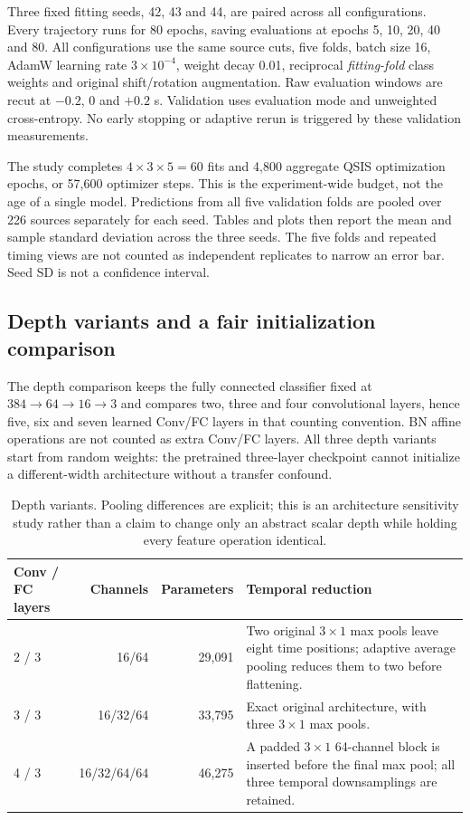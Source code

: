 \documentclass[a4paper,11pt,oneside]{article}
\begin{document}
Three fixed fitting seeds, 42, 43 and 44, are paired across all configurations.
Every trajectory runs for 80 epochs, saving evaluations at epochs 5, 10, 20,
40 and 80. All configurations use the same source cuts, five folds, batch
size 16, AdamW learning rate $3\times10^{-4}$, weight decay 0.01, reciprocal
\emph{fitting-fold} class weights and original shift/rotation augmentation.
Raw evaluation windows are recut at $-0.2$, 0 and $+0.2$ s. Validation uses
evaluation mode and unweighted cross-entropy. No early stopping or adaptive
rerun is triggered by these validation measurements.

The study completes $4\times3\times5=60$ fits and 4,800 aggregate QSIS
optimization epochs, or 57,600 optimizer steps. This is the experiment-wide
budget, not the age of a single model. Predictions from all five validation
folds are pooled over 226 sources separately for each seed. Tables and plots
then report the mean and sample standard deviation across the three seeds.
The five folds and repeated timing views are not counted as independent
replicates to narrow an error bar. Seed SD is not a confidence interval.

\subsection{Depth variants and a fair initialization comparison}
The depth comparison keeps the fully connected classifier fixed at
$384\rightarrow64\rightarrow16\rightarrow3$ and compares two, three and four
convolutional layers, hence five, six and seven learned Conv/FC layers in
that counting convention. BN affine operations are not counted as extra
Conv/FC layers. All three depth variants start from random weights: the
pretrained three-layer checkpoint cannot initialize a different-width
architecture without a transfer confound.

\begin{table}[htbp]\centering\small
\caption{Depth variants. Pooling differences are explicit; this is an
architecture sensitivity study rather than a claim to change only an
abstract scalar depth while holding every feature operation identical.}
\begin{tabularx}{\linewidth}{lrrY}
\toprule Conv / FC layers & Channels & Parameters & Temporal reduction \\ / 3 & 16/64 & 29,091 & Two original $3\times1$ max pools leave eight time positions; adaptive average pooling reduces them to two before flattening. \\
3 / 3 & 16/32/64 & 33,795 & Exact original architecture, with three $3\times1$ max pools. \\
4 / 3 & 16/32/64/64 & 46,275 & A padded $3\times1$ 64-channel block is inserted before the final max pool; all three temporal downsamplings are retained. \\\bottomrule
\end{tabularx}
\end{table}
\end{document}
